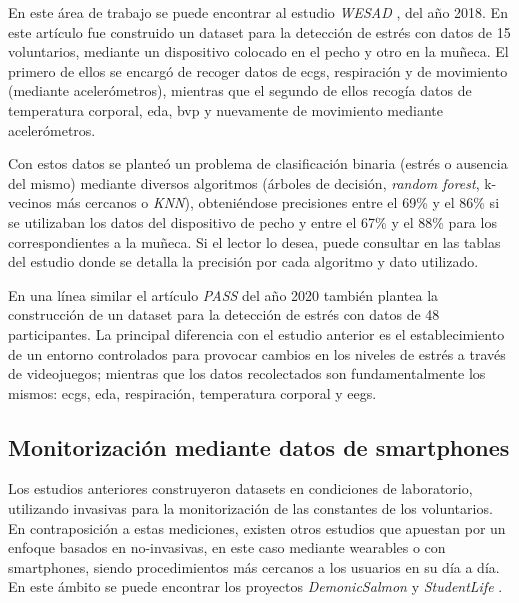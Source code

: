         En este área de trabajo se puede encontrar al estudio \textit{WESAD} \cite{schmidt_introducing_2018}, del año 2018. En este artículo fue construido un \gls{dataset} para la detección de estrés con datos de 15 voluntarios, mediante un dispositivo colocado en el pecho y otro en la muñeca. El primero de ellos se encargó de recoger datos de \glspl{ecg}, respiración y de movimiento (mediante acelerómetros), mientras que el segundo de ellos recogía datos de temperatura corporal, \gls{eda}, \gls{bvp} y nuevamente de movimiento mediante acelerómetros.

        Con estos datos se planteó un problema de clasificación binaria (estrés o ausencia del mismo) mediante diversos algoritmos (árboles de decisión, \textit{random forest}, k-vecinos más cercanos o \textit{KNN}), obteniéndose precisiones entre el 69\% y el 86\% si se utilizaban los datos del dispositivo de pecho y entre el 67\% y el 88\% para los correspondientes a la muñeca. Si el lector lo desea, puede consultar en \cite{schmidt_introducing_2018} las tablas del estudio donde se detalla la precisión por cada algoritmo y dato utilizado.

        En una línea similar el artículo \textit{PASS} \cite{parent_pass_2020} del año 2020 también plantea la construcción de un \gls{dataset} para la detección de estrés con datos de 48 participantes. La principal diferencia con el estudio anterior es el establecimiento de un entorno controlados para provocar cambios en los niveles de estrés a través de videojuegos; mientras que los datos recolectados son fundamentalmente los mismos: \glspl{ecg}, \gls{eda}, respiración, temperatura corporal y \glspl{eeg}.

    \subsection{Monitorización mediante datos de \glspl{smartphone}}
        \label{sec:estado_arte:smartphone}

        Los estudios anteriores construyeron \glspl{dataset} en condiciones de laboratorio, utilizando \glspl{invasiva} para la monitorización de las constantes de los voluntarios. En contraposición a estas mediciones, existen otros estudios que apuestan por un enfoque basados en \glspl{no-invasiva}, en este caso mediante \glspl{wearable} o con \glspl{smartphone}, siendo procedimientos más cercanos a los usuarios en su día a día. En este ámbito se puede encontrar los proyectos \textit{DemonicSalmon} \cite{boukhechba_demonicsalmon_2018} y \textit{StudentLife} \cite{rui_studentlife_2014}.


